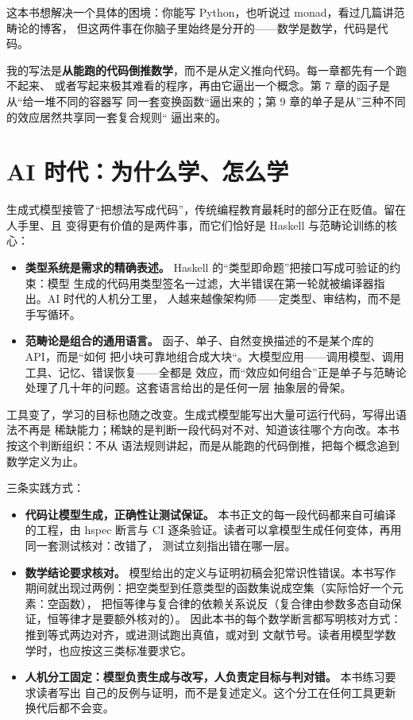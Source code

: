 这本书想解决一个具体的困境：你能写 Python，也听说过 monad，看过几篇讲范畴论的博客，
但这两件事在你脑子里始终是分开的------数学是数学，代码是代码。

我的写法是\textbf{从能跑的代码倒推数学}，而不是从定义推向代码。每一章都先有一个跑不起来、
或者写起来极其难看的程序，再由它逼出一个概念。第 7 章的函子是从“给一堆不同的容器写
同一套变换函数“逼出来的；第 9 章的单子是从”三种不同的效应居然共享同一套复合规则“
逼出来的。

\section{AI 时代：为什么学、怎么学}\label{ai-ux65f6ux4ee3ux4e3aux4ec0ux4e48ux5b66ux600eux4e48ux5b66}

生成式模型接管了“把想法写成代码”，传统编程教育最耗时的部分正在贬值。留在人手里、且
变得更有价值的是两件事，而它们恰好是 Haskell 与范畴论训练的核心：

\begin{itemize}
\tightlist
\item
  \textbf{类型系统是需求的精确表述。} Haskell 的“类型即命题”把接口写成可验证的约束：模型
  生成的代码用类型签名一过滤，大半错误在第一轮就被编译器指出。AI 时代的人机分工里，
  人越来越像架构师------定类型、审结构，而不是手写循环。
\item
  \textbf{范畴论是组合的通用语言。} 函子、单子、自然变换描述的不是某个库的 API，而是“如何
  把小块可靠地组合成大块“。大模型应用------调用模型、调用工具、记忆、错误恢复------全都是
  效应，而“效应如何组合”正是单子与范畴论处理了几十年的问题。这套语言给出的是任何一层
  抽象层的骨架。
\end{itemize}

工具变了，学习的目标也随之改变。生成式模型能写出大量可运行代码，写得出语法不再是
稀缺能力；稀缺的是判断一段代码对不对、知道该往哪个方向改。本书按这个判断组织：不从
语法规则讲起，而是从能跑的代码倒推，把每个概念追到数学定义为止。

三条实践方式：

\begin{itemize}
\tightlist
\item
  \textbf{代码让模型生成，正确性让测试保证。} 本书正文的每一段代码都来自可编译的工程，由
  hspec 断言与 CI 逐条验证。读者可以拿模型生成任何变体，再用同一套测试核对：改错了，
  测试立刻指出错在哪一层。
\item
  \textbf{数学结论要求核对。} 模型给出的定义与证明初稿会犯常识性错误。本书写作
  期间就出现过两例：把空类型到任意类型的函数集说成空集（实际恰好一个元素：空函数），
  把恒等律与复合律的依赖关系说反（复合律由参数多态自动保证，恒等律才是要额外核对的）。
  因此本书的每个数学断言都写明核对方式：推到等式两边对齐，或进测试跑出真值，或对到
  文献节号。读者用模型学数学时，也应按这三类标准要求它。
\item
  \textbf{人机分工固定：模型负责生成与改写，人负责定目标与判对错。} 本书练习要求读者写出
  自己的反例与证明，而不是复述定义。这个分工在任何工具更新换代后都不会变。
\end{itemize}

